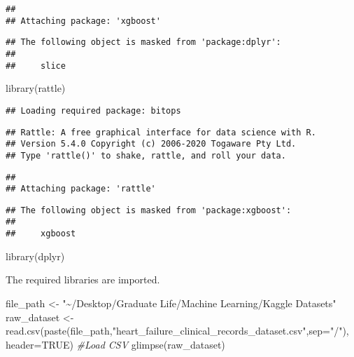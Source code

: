 \documentclass[
]{article}
\newenvironment{Shaded}{\begin{snugshade}}{\end{snugshade}}
\newcommand{\AttributeTok}[1]{\textcolor[rgb]{0.77,0.63,0.00}{#1}}
\newcommand{\CommentTok}[1]{\textcolor[rgb]{0.56,0.35,0.01}{\textit{#1}}}
\newcommand{\ConstantTok}[1]{\textcolor[rgb]{0.00,0.00,0.00}{#1}}
\newcommand{\FunctionTok}[1]{\textcolor[rgb]{0.00,0.00,0.00}{#1}}
\newcommand{\NormalTok}[1]{#1}
\newcommand{\OtherTok}[1]{\textcolor[rgb]{0.56,0.35,0.01}{#1}}
\newcommand{\StringTok}[1]{\textcolor[rgb]{0.31,0.60,0.02}{#1}}
\begin{document}
\begin{verbatim}
## 
## Attaching package: 'xgboost'
\end{verbatim}

\begin{verbatim}
## The following object is masked from 'package:dplyr':
## 
##     slice
\end{verbatim}

\begin{Shaded}
\begin{Highlighting}[]
\FunctionTok{library}\NormalTok{(rattle)}
\end{Highlighting}
\end{Shaded}

\begin{verbatim}
## Loading required package: bitops
\end{verbatim}

\begin{verbatim}
## Rattle: A free graphical interface for data science with R.
## Version 5.4.0 Copyright (c) 2006-2020 Togaware Pty Ltd.
## Type 'rattle()' to shake, rattle, and roll your data.
\end{verbatim}

\begin{verbatim}
## 
## Attaching package: 'rattle'
\end{verbatim}

\begin{verbatim}
## The following object is masked from 'package:xgboost':
## 
##     xgboost
\end{verbatim}

\begin{Shaded}
\begin{Highlighting}[]
\FunctionTok{library}\NormalTok{(dplyr)}
\end{Highlighting}
\end{Shaded}

The required libraries are imported.

\begin{Shaded}
\begin{Highlighting}[]
\NormalTok{file\_path }\OtherTok{\textless{}{-}} \StringTok{"\textasciitilde{}/Desktop/Graduate Life/Machine Learning/Kaggle Datasets"}
\NormalTok{raw\_dataset }\OtherTok{\textless{}{-}} \FunctionTok{read.csv}\NormalTok{(}\FunctionTok{paste}\NormalTok{(file\_path,}\StringTok{"heart\_failure\_clinical\_records\_dataset.csv"}\NormalTok{,}\AttributeTok{sep=}\StringTok{"/"}\NormalTok{), }\AttributeTok{header=}\ConstantTok{TRUE}\NormalTok{) }\CommentTok{\#Load CSV}
\FunctionTok{glimpse}\NormalTok{(raw\_dataset)}
\end{Highlighting}
\end{Shaded}
\end{document}
